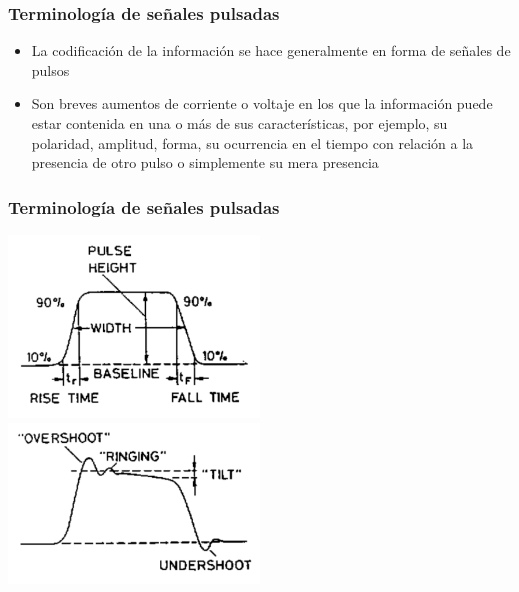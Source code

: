 \documentclass{beamer}
\begin{document}
\begin{frame}
\frametitle{Terminología de señales pulsadas}
\begin{itemize}
\item La codificación de la información se hace generalmente en forma de señales
de pulsos 
\item Son breves aumentos de corriente o voltaje en los que la información puede
estar contenida en una o más de sus características, por ejemplo, su polaridad,
amplitud, forma, su ocurrencia en el tiempo con relación a la presencia de otro
pulso o simplemente su mera presencia
\end{itemize}
\end{frame} 

\begin{frame}
\frametitle{Terminología de señales pulsadas}
\includegraphics[width=0.5\textwidth]{d2/parametros_pulso}
\includegraphics[width=0.5\textwidth]{d2/parametros_pulso2}
\end{frame} 
\end{document}

